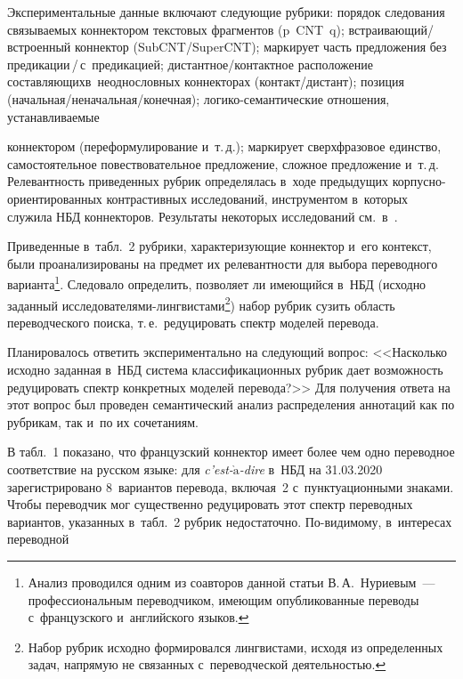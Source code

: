 \begin{multicols}{2}
  Экспериментальные данные включают следующие рубрики: порядок 
следования связываемых коннектором текстовых фрагментов (p~CNT~q); 
встраи\-ва\-ющий/встро\-ен\-ный коннектор (SubCNT/SuperCNT); маркирует часть 
предложения без пре\-ди\-ка\-ции\,/\,с~пре\-ди\-ка\-ци\-ей; 
ди\-стант\-ное/кон\-такт\-ное расположение составляющих\linebreak в~неоднословных 
коннекторах  (кон\-такт/дис\-тант); позиция  
(на\-чаль\-ная/не\-на\-чаль\-ная/ко\-неч\-ная); ло\-ги\-ко-се\-ман\-ти\-че\-ские 
отношения, устанавливаемые\linebreak

\columnbreak

\noindent
 коннектором (переформулирование и~т.\,д.); 
маркирует сверхфразовое единство, самостоятельное повествовательное 
предложение, сложное предложение и~т.\,д. Релевантность приведенных рубрик 
определялась в~ходе предыдущих кор\-пус\-но-ори\-ен\-ти\-ро\-ван\-ных 
контрастивных исследований, инструментом в~которых служила НБД 
коннекторов. Результаты некоторых исследований см.\ в~\cite{19-nur, 20-nur, 
21-nur, 22-nur, 23-nur, 24-nur, 25-nur}.
  
  Приведенные в~табл.~2 рубрики, характери\-зу\-ющие коннектор и~его контекст, 
были проанализированы на предмет их релевантности для выбора переводного 
варианта\footnote{Анализ проводился одним из соавторов данной статьи В.\,А.~Нуриевым~--- 
профессиональным переводчиком, имеющим опубликованные переводы с~французского и~английского 
языков.}. Следовало определить, позволяет ли имеющийся в~НБД (исходно 
заданный  
ис\-сле\-до\-ва\-те\-ля\-ми-линг\-ви\-ста\-ми\footnote{Набор рубрик исходно формировался лингвистами, 
исходя из определенных задач, напрямую не связанных с~переводческой деятельностью.}) набор 
рубрик \mbox{сузить} об\-ласть переводческого поиска, т.\,е.\ редуцировать спектр моделей 
перевода.
  
  Планировалось ответить экспериментально на следующий вопрос: 
<<Насколько исходно заданная в~НБД система классификационных рубрик дает 
возможность редуцировать спектр конкретных моделей перевода?>> Для 
получения ответа на этот вопрос был проведен семантический анализ 
распределения аннотаций как по рубрикам, так и~по их сочетаниям.
  
  В табл.~1 показано, что французский коннектор имеет более чем одно 
переводное соответствие на русском языке: 
для \textit{c'est-$\grave{\mbox{a}}$-dire} в~НБД на 31.03.2020 
зарегистрировано 8~вариантов перевода, включая~2 
с~пунктуационными знаками. Чтобы переводчик мог существенно редуцировать 
этот спектр переводных вариантов, указанных в~табл.~2 рубрик недостаточно. 
По-ви\-ди\-мо\-му, в~интересах переводной\linebreak
\end{multicols}

